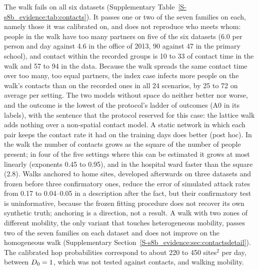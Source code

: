 The walk fails on all six datasets (Supplementary Table~\ref{S-s8b_evidence:tab:contacts}). It passes one or two of the seven
families on each, namely those it was calibrated on, and does not reproduce who meets whom: people in the walk
have too many partners on five of the six datasets (6.0 per person and day against 4.6 in the office of 2013, 90
against 47 in the primary school), and contact within the recorded groups is 10 to 33\pct{} of contact time in
the walk and 57 to 94\pct{} in the data. Because the walk spreads the same contact time over too many, too equal
partners, the index case infects more people on the walk's contacts than on the recorded ones in all 24
scenarios, by 25 to 72\pct{} on average per setting. The two models without space do neither better nor worse,
and the outcome is the lowest of the protocol's ladder of outcomes (A0 in its labels), with the sentence that the
protocol reserved for this case: the lattice walk adds nothing over a non-spatial contact model. A static network in which each pair keeps the contact rate it had on the
training days does better (post hoc). In the walk the number of contacts grows as the square of the number of
people present; in four of the five settings where this can be estimated it grows at most linearly (exponents
0.45 to 0.95), and in the hospital ward faster than the square (2.8).
Walks anchored to home sites, developed afterwards on three datasets and frozen before three confirmatory ones,
reduce the error of simulated attack rates from 0.17 to 0.04--0.05 in a description after the fact, but their
confirmatory test is uninformative, because the frozen fitting procedure does not recover its own synthetic
truth; anchoring is a direction, not a result. A walk with two zones of different mobility, the only variant
that touches heterogeneous mobility, passes two of the seven families on each dataset and does not improve on the
homogeneous walk (Supplementary Section~\ref{S-s8b_evidence:sec:contactsdetail}). The calibrated hop probabilities correspond to about 220 to 450
sites$^2$ per day, between $D_0=1$, which was not tested against contacts, and walking mobility.

